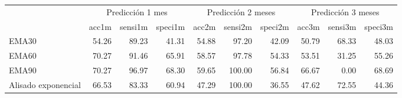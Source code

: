 \documentclass[]{article}
\newenvironment{Shaded}{\begin{snugshade}}{\end{snugshade}}
\newcommand{\KeywordTok}[1]{\textcolor[rgb]{0.13,0.29,0.53}{\textbf{#1}}}
\newcommand{\DataTypeTok}[1]{\textcolor[rgb]{0.13,0.29,0.53}{#1}}
\newcommand{\DecValTok}[1]{\textcolor[rgb]{0.00,0.00,0.81}{#1}}
\newcommand{\StringTok}[1]{\textcolor[rgb]{0.31,0.60,0.02}{#1}}
\newcommand{\OperatorTok}[1]{\textcolor[rgb]{0.81,0.36,0.00}{\textbf{#1}}}
\newcommand{\NormalTok}[1]{#1}
\begin{document}
\begin{Shaded}
\end{Shaded}

\begin{table}[H]
\centering\begingroup\fontsize{10}{12}\selectfont

\begin{tabular}{l|r|r|r|r|r|r|r|r|r}
\hline
\multicolumn{1}{c|}{ } & \multicolumn{3}{|c|}{Predicción 1 mes} & \multicolumn{3}{|c|}{Predicción 2 meses} & \multicolumn{3}{|c}{Predicción 3 meses} \\
\cline{2-4} \cline{5-7} \cline{8-10}
  & acc1m & sensi1m & speci1m & acc2m & sensi2m & speci2m & acc3m & sensi3m & speci3m\\
\hline
EMA30 & 54.26 & 89.23 & 41.31 & 54.88 & 97.20 & 42.09 & 50.79 & 68.33 & 48.03\\
\hline
EMA60 & 70.27 & 91.46 & 65.91 & 58.57 & 97.78 & 54.33 & 53.51 & 31.25 & 55.26\\
\hline
EMA90 & 70.27 & 96.97 & 68.30 & 59.65 & 100.00 & 56.84 & 66.67 & 0.00 & 68.69\\
\hline
Alisado exponencial & 66.53 & 83.33 & 60.94 & 47.29 & 100.00 & 36.55 & 47.62 & 72.55 & 44.36\\
\hline
\end{tabular}\endgroup{}
\end{table}
\end{document}
